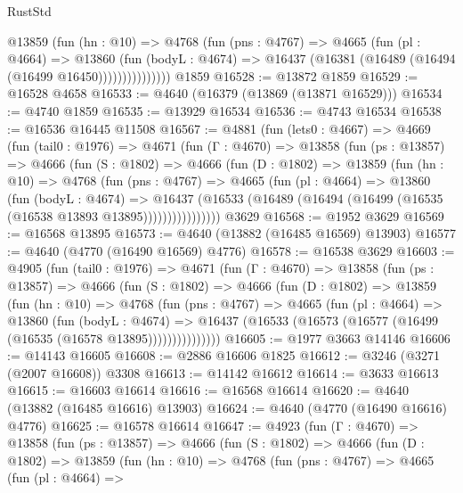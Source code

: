 \begin{lexlean}{RustStd}
\begin{coremodule}
                @13859
                  (fun (hn : @10) =>
                  @4768
                    (fun (pns : @4767) =>
                    @4665
                      (fun (pl : @4664) =>
                      @13860
                        (fun (bodyL : @4674) =>
                        @16437 (@16381 (@16489 (@16494 (@16499 @16450)))))))))))))))
    @1859
@16528 := @13872 @1859
@16529 := @16528 @4658
@16533 := @4640 (@16379 (@13869 (@13871 @16529)))
@16534 := @4740 @1859
@16535 := @13929 @16534
@16536 := @4743 @16534
@16538 := @16536 @16445 @11508
@16567 := @4881
    (fun (lets0 : @4667) =>
    @4669
      (fun (tail0 : @1976) =>
      @4671
        (fun (Γ : @4670) =>
        @13858
          (fun (ps : @13857) =>
          @4666
            (fun (S : @1802) =>
            @4666
              (fun (D : @1802) =>
              @13859
                (fun (hn : @10) =>
                @4768
                  (fun (pns : @4767) =>
                  @4665
                    (fun (pl : @4664) =>
                    @13860
                      (fun (bodyL : @4674) =>
                      @16437
                        (@16533
                          (@16489 (@16494 (@16499 (@16535 (@16538 @13893 @13895))))))))))))))))
    @3629
@16568 := @1952 @3629
@16569 := @16568 @13895
@16573 := @4640 (@13882 (@16485 @16569) @13903)
@16577 := @4640 (@4770 (@16490 @16569) @4776)
@16578 := @16538 @3629
@16603 := @4905
    (fun (tail0 : @1976) =>
    @4671
      (fun (Γ : @4670) =>
      @13858
        (fun (ps : @13857) =>
        @4666
          (fun (S : @1802) =>
          @4666
            (fun (D : @1802) =>
            @13859
              (fun (hn : @10) =>
              @4768
                (fun (pns : @4767) =>
                @4665
                  (fun (pl : @4664) =>
                  @13860
                    (fun (bodyL : @4674) =>
                    @16437 (@16533 (@16573 (@16577 (@16499 (@16535 (@16578 @13895)))))))))))))))
@16605 := @1977 @3663 @14146
@16606 := @14143 @16605
@16608 := @2886 @16606 @1825
@16612 := @3246 (@3271 (@2007 @16608)) @3308
@16613 := @14142 @16612
@16614 := @3633 @16613
@16615 := @16603 @16614
@16616 := @16568 @16614
@16620 := @4640 (@13882 (@16485 @16616) @13903)
@16624 := @4640 (@4770 (@16490 @16616) @4776)
@16625 := @16578 @16614
@16647 := @4923
    (fun (Γ : @4670) =>
    @13858
      (fun (ps : @13857) =>
      @4666
        (fun (S : @1802) =>
        @4666
          (fun (D : @1802) =>
          @13859
            (fun (hn : @10) =>
            @4768
              (fun (pns : @4767) =>
              @4665
                (fun (pl : @4664) =>

\end{coremodule}
\end{lexlean}
